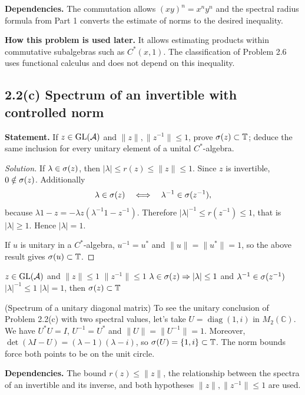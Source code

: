 \noindent\textbf{Dependencies.} The commutation allows $(xy)^n=x^ny^n$ and the spectral radius formula from Part 1 converts the estimate of norms to the desired inequality.

\noindent\textbf{How this problem is used later.} It allows estimating products within commutative subalgebras such as $C^*(x,1)$. The classification of Problem 2.6 uses functional calculus and does not depend on this inequality.

\subsection*{2.2(c) Spectrum of an invertible with controlled norm}

\noindent\textbf{Statement.} If $z\in\operatorname{GL}(\mathcal A)$ and $\|z\|,\|z^{-1}\|\le1$, prove $\sigma(z)\subset\mathbb T$; deduce the same inclusion for every unitary element of a unital $C^*$-algebra.

\begin{proof}[Solution]
If $\lambda\in\sigma(z)$, then $|\lambda|\le r(z)\le\|z\|\le1$. Since $z$ is invertible,
$0\notin\sigma(z)$. Additionally
\[
 \lambda\in\sigma(z)\quad\Longleftrightarrow\quad
 \lambda^{-1}\in\sigma(z^{-1}),
\]
because
$\lambda1-z=-\lambda z(\lambda^{-1}1-z^{-1})$. Therefore
$|\lambda|^{-1}\le r(z^{-1})\le1$, that is $|\lambda|\ge1$. Hence $|\lambda|=1$.

If $u$ is unitary in a $C^*$-algebra, $u^{-1}=u^*$ and
$\|u\|=\|u^*\|=1$, so the above result gives
$\sigma(u)\subset\mathbb T$.
\end{proof}

\proofdiagrambranch
{$z\in\operatorname{GL}(\mathcal A)$ and $\|z\|\le1$}
{$\|z^{-1}\|\le1$}
{$\lambda\in\sigma(z)\Rightarrow |\lambda|\le1$ and $\lambda^{-1}\in\sigma(z^{-1})$}
{$|\lambda|^{-1}\le1$}
{$|\lambda|=1$, then $\sigma(z)\subset\mathbb T$}

\begin{cthejemplo}{(Spectrum of a unitary diagonal matrix)}
To see the unitary conclusion of Problem 2.2(c) with two spectral values, let's take
$U=\operatorname{diag}(1,i)$ in $M_2(\mathbb C)$.
We have $U^*U=I$, $U^{-1}=U^*$ and $\|U\|=\|U^{-1}\|=1$.
Moreover, $\det(\lambda I-U)=(\lambda-1)(\lambda-i)$, so
$\sigma(U)=\{1,i\}\subset\mathbb T$.
The norm bounds force both points to be on the unit circle.
\end{cthejemplo}

\noindent\textbf{Dependencies.} The bound $r(z)\le\|z\|$, the relationship between the spectra of an invertible and its inverse, and both hypotheses $\|z\|,\|z^{-1}\|\le1$ are used.

